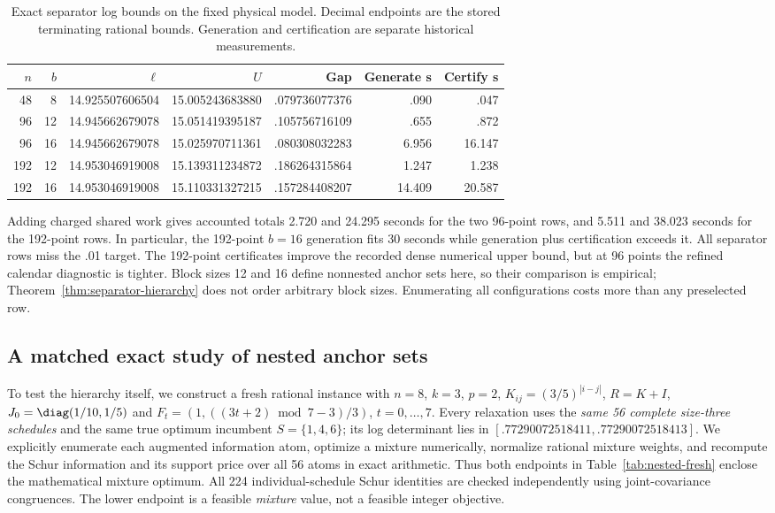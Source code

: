 \begin{table}[htbp]
\centering\small
\caption{Exact separator log bounds on the fixed physical model. Decimal
endpoints are the stored terminating rational bounds. Generation and
certification are separate historical measurements.}
\label{tab:separator-certificates}
\begin{tabular}{rrrrrrr}
\toprule
$n$ & $b$ & $\ell$ & $U$ & Gap & Generate s & Certify s\\
\midrule
48&8&14.925507606504&15.005243683880&.079736077376&.090&.047\\
96&12&14.945662679078&15.051419395187&.105756716109&.655&.872\\
96&16&14.945662679078&15.025970711361&.080308032283&6.956&16.147\\
192&12&14.953046919008&15.139311234872&.186264315864&1.247&1.238\\
192&16&14.953046919008&15.110331327215&.157284408207&14.409&20.587\\
\bottomrule
\end{tabular}
\end{table}

Adding charged shared work gives accounted totals 2.720 and 24.295 seconds
for the two 96-point rows, and 5.511 and 38.023 seconds for the 192-point rows.
In particular, the 192-point $b=16$ generation fits 30 seconds while generation
plus certification exceeds it. All separator rows miss the .01 target. The
192-point certificates improve the recorded dense numerical upper bound, but
at 96 points the refined calendar diagnostic is tighter. Block sizes 12 and
16 define nonnested anchor sets here, so their comparison is empirical;
Theorem~\ref{thm:separator-hierarchy} does not order arbitrary block sizes.
Enumerating all configurations costs more than any preselected row.

\subsection{A matched exact study of nested anchor sets}
\label{subsec:nested-experiment}

To test the hierarchy itself, we construct a fresh rational instance with
$n=8$, $k=3$, $p=2$, $K_{ij}=(3/5)^{|i-j|}$, $R=K+I$,
$J_0=\diag(1/10,1/5)$ and
$F_t=(1,((3t+2)\bmod7-3)/3)$, $t=0,\ldots,7$.
Every relaxation uses the \emph{same 56 complete size-three schedules} and
the same true optimum incumbent $S=\{1,4,6\}$; its log determinant lies in
$[.77290072518411,.77290072518413]$. We explicitly enumerate each augmented
information atom, optimize a mixture numerically, normalize rational mixture
weights, and recompute the Schur information and its support price over all
56 atoms in exact arithmetic. Thus both endpoints in
Table~\ref{tab:nested-fresh} enclose the mathematical mixture optimum.
All 224 individual-schedule Schur identities are checked independently using
joint-covariance congruences. The lower endpoint is a feasible \emph{mixture}
value, not a feasible integer objective.

